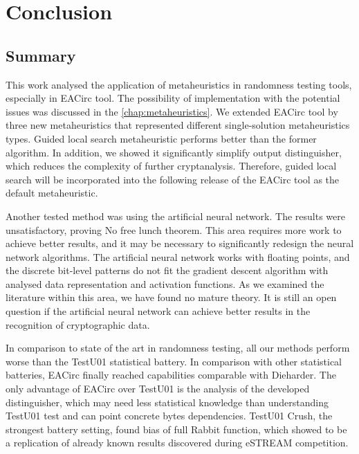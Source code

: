 \documentclass[
  print, %
  Table,   %
  nolof,     %
  nolot,     %
  11pt, %
  oneside  %
]{fithesis3}
\begin{document}

\chapter{Conclusion}
\label{chap:conclusion}

\section{Summary}
\label{sec:conclusion-summary}

This work analysed the application of metaheuristics in randomness testing tools, especially in EACirc tool. The possibility of implementation with the potential issues was discussed in the \cref{chap:metaheuristics}. We extended EACirc tool by three new metaheuristics that represented different single-solution metaheuristics types. Guided local search metaheuristic performs better than the former algorithm. In addition, we showed it significantly simplify output distinguisher, which reduces the complexity of further cryptanalysis. Therefore, guided local search will be incorporated into the following release of the EACirc tool as the default metaheuristic.

Another tested method was using the artificial neural network. The results were unsatisfactory, proving No free lunch theorem. This area requires more work to achieve better results, and it may be necessary to significantly redesign the neural network algorithms. The artificial neural network works with floating points, and the discrete bit-level patterns do not fit the gradient descent algorithm with analysed data representation and activation functions. As we examined the literature within this area, we have found no mature theory. It is still an open question if the artificial neural network can achieve better results in the recognition of cryptographic data.

In comparison to state of the art in randomness testing, all our methods perform worse than the TestU01 statistical battery. In comparison with other statistical batteries, EACirc finally reached capabilities comparable with Dieharder. The only advantage of EACirc over TestU01 is the analysis of the developed distinguisher, which may need less statistical knowledge than understanding TestU01 test and can point concrete bytes dependencies. TestU01 Crush, the strongest battery setting, found bias of full Rabbit function, which showed to be a replication of already known results discovered during eSTREAM competition.
\end{document}
